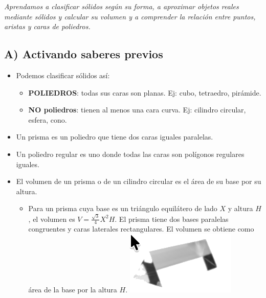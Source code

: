 \documentclass[12pt,a4paper]{article}
\begin{document}
\textit{Aprendamos a clasificar sólidos según su forma, a aproximar objetos reales mediante sólidos y calcular su volumen y a comprender la relación entre puntos, aristas y caras de poliedros.}

\subsection*{A) Activando saberes previos}


\begin{tcolorbox}[enhanced, breakable,
	colback=fondoazul, colframe=azuloscuro, title=\textbf{RECUERDA QUE...}, breakable]
	\begin{itemize}[nosep]
		\item Podemos clasificar sólidos así:
		\begin{itemize}[nosep]
			\item \textbf{POLIEDROS}: todas sus caras son planas. Ej: cubo, tetraedro, pirámide.
			\item \textbf{NO poliedros}: tienen al menos una cara curva. Ej: cilindro circular, esfera, cono.
		\end{itemize}
		
		\item Un prisma es un poliedro que tiene dos caras iguales paralelas.
		\item Un poliedro regular es uno donde todas las caras son polígonos regulares iguales.
		\item El volumen de un prisma o de un cilindro circular es el área de su base por su altura.
		
		\begin{itemize}[nosep]
			\item %
			\begin{tcolorbox}[enhanced, frame hidden, boxrule=0pt, colback=fondoazul,
				sidebyside, sidebyside align=top seam, sidebyside gap=8pt,
				righthand width=0.15\textwidth]
				Para un prisma cuya base es un triángulo equilátero de lado $X$ y altura $H$,
				el volumen es $V=\frac{\sqrt{3}}{4}X^2H$. El prisma tiene dos bases paralelas
				congruentes y caras laterales rectangulares. El volumen se obtiene como área
				de la base por la altura $H$.
				\tcblower
				\includegraphics[width=\linewidth]{Figuras/fig2.png}
			\end{tcolorbox}
			

\end{itemize}
\end{itemize}
\end{tcolorbox}
\end{document}
